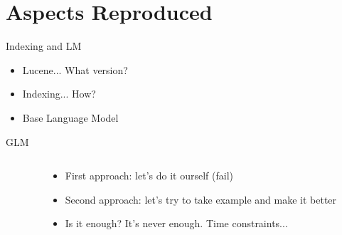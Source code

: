 \section{Aspects Reproduced}
\begin{frame}{Indexing and LM}
    \begin{itemize}
        \item Lucene... What version?
    \end{itemize}
    \bigskip
    \begin{itemize}
        \item Indexing... How?
    \end{itemize}
    \bigskip
    \begin{itemize}
        \item Base Language Model
    \end{itemize}
\end{frame}

\begin{frame}{GLM}
    \begin{columns}
        \begin{column}{0.5\textwidth}
        \end{column}
        \begin{column}{0.5\textwidth}
            \begin{itemize}
                \item First approach: let's do it ourself (fail)
            \end{itemize}
            \bigskip
            \begin{itemize}
                \item Second approach: let's try to take example and make it better
            \end{itemize}
            \bigskip
            \begin{itemize}
                \item Is it enough? It's never enough. Time constraints...
            \end{itemize}
        \end{column}
    \end{columns}
\end{frame}
